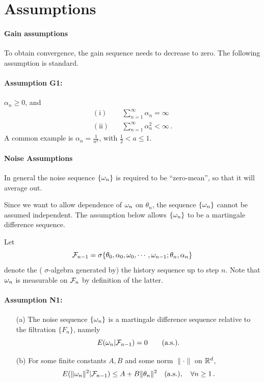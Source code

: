 \section{Assumptions}

\paragraph{Gain assumptions}

To obtain convergence, the gain sequence needs to decrease to zero.
The following assumption is standard.

\paragraph{Assumption G1:}  $\alpha_n \ge 0$, and
\begin{align*}
\mathrm{(i)} \quad & \sum_{n=1}^\infty \alpha_n = \infty\\
\mathrm{(ii)} \quad& \sum_{n=1}^\infty \alpha_n^2 < \infty\,.
\end{align*}
A common example is  $\displaystyle{\alpha_n=\frac{1}{n^a}}$, with
$\frac{1}{2} < a \le 1$.

\paragraph{Noise Assumptions}

In general the noise sequence $\{\omega_n\}$ is required to be ``zero-mean'',
so that it will average out.

Since we want to allow dependence
of $\omega_n$ on $\theta_n$, the sequence $\{\omega_n\}$ cannot be assumed
independent. The assumption below allows $\{\omega_n\}$ to be a martingale
difference sequence.

Let
$$
\mathcal F_{n-1} = \sigma \{ \theta_0, \alpha_0, \omega_0, \cdots, \omega_{n-1};
\theta_n, \alpha_n\}
$$
denote the ( $\sigma$-algebra generated by) the history sequence up to
step $n$. Note that $\omega_n$ is measurable on $\mathcal F_n$ by definition of the latter.

\paragraph{Assumption N1:}
\begin{itemize}
\item[(a)]
The noise sequence $\{\omega_n\}$ is a martingale difference sequence relative to the
filtration $\{F_n\}$, namely
$$
E(\omega_n | \mathcal F_{n-1}) = 0 \qquad \text{(a.s.)}.
$$
\item[(b)] For some finite constants $A,B$ and some norm $\|\cdot \|$ on $\mathbb{R}^d$,
$$E(\| \omega_n\|^2 | \mathcal F_{n-1}) \le A + B \| \theta_n\|^2 \quad \text{(a.s.)},
\quad \forall n\ge 1\,.$$
\end{itemize}

